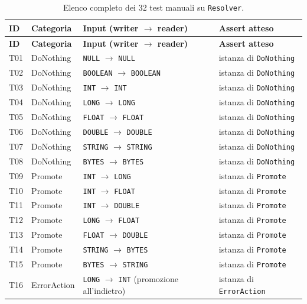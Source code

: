 \begin{longtable}{@{}p{0.9cm}p{2.6cm}p{6.1cm}p{5.7cm}@{}}
\caption{Elenco completo dei 32 test manuali su \texttt{Resolver}.}
\label{tab:resolver-elenco-test} \\
\toprule
\textbf{ID} & \textbf{Categoria} & \textbf{Input (writer $\to$ reader)} & \textbf{Assert atteso} \\
\midrule
\endfirsthead
\toprule
\textbf{ID} & \textbf{Categoria} & \textbf{Input (writer $\to$ reader)} & \textbf{Assert atteso} \\
\midrule
\endhead
T01 & DoNothing & \texttt{NULL} $\to$ \texttt{NULL} & istanza di \texttt{DoNothing} \\
T02 & DoNothing & \texttt{BOOLEAN} $\to$ \texttt{BOOLEAN} & istanza di \texttt{DoNothing} \\
T03 & DoNothing & \texttt{INT} $\to$ \texttt{INT} & istanza di \texttt{DoNothing} \\
T04 & DoNothing & \texttt{LONG} $\to$ \texttt{LONG} & istanza di \texttt{DoNothing} \\
T05 & DoNothing & \texttt{FLOAT} $\to$ \texttt{FLOAT} & istanza di \texttt{DoNothing} \\
T06 & DoNothing & \texttt{DOUBLE} $\to$ \texttt{DOUBLE} & istanza di \texttt{DoNothing} \\
T07 & DoNothing & \texttt{STRING} $\to$ \texttt{STRING} & istanza di \texttt{DoNothing} \\
T08 & DoNothing & \texttt{BYTES} $\to$ \texttt{BYTES} & istanza di \texttt{DoNothing} \\
T09 & Promote & \texttt{INT} $\to$ \texttt{LONG} & istanza di \texttt{Promote} \\
T10 & Promote & \texttt{INT} $\to$ \texttt{FLOAT} & istanza di \texttt{Promote} \\
T11 & Promote & \texttt{INT} $\to$ \texttt{DOUBLE} & istanza di \texttt{Promote} \\
T12 & Promote & \texttt{LONG} $\to$ \texttt{FLOAT} & istanza di \texttt{Promote} \\
T13 & Promote & \texttt{FLOAT} $\to$ \texttt{DOUBLE} & istanza di \texttt{Promote} \\
T14 & Promote & \texttt{STRING} $\to$ \texttt{BYTES} & istanza di \texttt{Promote} \\
T15 & Promote & \texttt{BYTES} $\to$ \texttt{STRING} & istanza di \texttt{Promote} \\
T16 & ErrorAction & \texttt{LONG} $\to$ \texttt{INT} (promozione all'indietro) & istanza di \texttt{ErrorAction} \\

\end{longtable}
